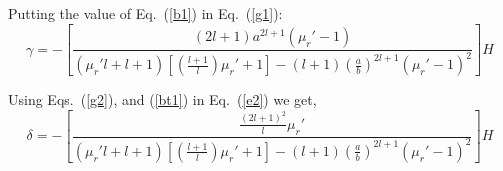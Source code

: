 

Putting the value of Eq.~(\ref{b1}) in Eq.~(\ref{g1}):
\begin{equation}\label{g2}
\gamma=-\left[\frac{(2l+1)a^{2l+1}(\mu_r'-1)}{(\mu_r'l+l+1)\left[\left(\frac{l+1}{l}\right)\mu_r'+1\right]-(l+1)\left(\frac{a}{b}\right)^{2l+1}(\mu_r'-1)^2}\right] H    
\end{equation}


Using Eqs.~(\ref{g2}), and (\ref{bt1}) in Eq.~(\ref{e2}) we get,
\begin{equation}\label{dt1}
\delta =-\left[\frac{\frac{(2l+1)^2}{l}\mu_r'}{(\mu_r'l+l+1)\left[\left(\frac{l+1}{l}\right)\mu_r'+1\right]-(l+1)\left(\frac{a}{b}\right)^{2l+1}(\mu_r'-1)^2}\right]H    
\end{equation}



